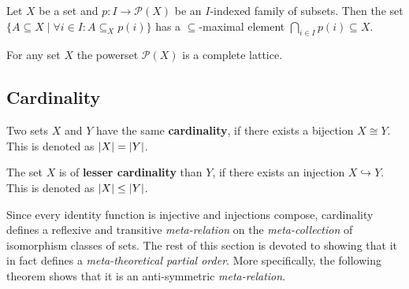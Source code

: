 \documentclass{article}
\begin{document}


	\begin{proposition}
		Let $X$ be a set and $p:I \rightarrow \mathcal{P}(X)$ be an $I$-indexed family of subsets. Then the set $\{A\subseteq X\mid \forall i\in I: A\subseteq_X p(i)\}$ has a $\subseteq$-maximal element $\bigcap\limits_{i\in I} p(i) \subseteq X$.
	\end{proposition}

	\begin{proposition}
		For any set $X$ the powerset $\mathcal{P}(X)$ is a complete lattice.
	\end{proposition}


	\newpage
	\subsection{Cardinality}

	\begin{definition}
		Two sets $X$ and $Y$ have the same \textbf{cardinality}, if there exists a bijection $X \cong Y$. This is denoted as $\vert X\vert = \vert Y\vert$.

		The set $X$ is of \textbf{lesser cardinality} than $Y$, if there exists an injection $X \hookrightarrow Y$. This is denoted as $\vert X\vert\leq\vert Y\vert$.
	\end{definition}

	Since every identity function is injective and injections compose, cardinality defines a reflexive and transitive \textit{meta-relation} on the \textit{meta-collection} of isomorphism classes of sets. The rest of this section is devoted to showing that it in fact defines a \textit{meta-theoretical partial order}. More specifically, the following theorem shows that it is an anti-symmetric \textit{meta-relation}.
\end{document}
